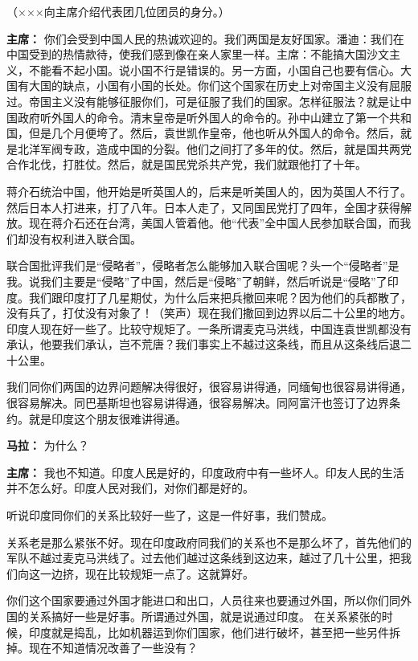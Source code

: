 \begin{list}{}
（×××向主席介绍代表团几位团员的身分。）

\item[\textbf{主席：}] 你们会受到中国人民的热诚欢迎的。我们两国是友好国家。潘迪：我们在中国受到的热情款待，使我们感到像在亲人家里一样。主席：不能搞大国沙文主义，不能看不起小国。说小国不行是错误的。另一方面，小国自己也要有信心。大国有大国的缺点，小国有小国的长处。你们这个国家在历史上对帝国主义没有屈服过。帝国主义没有能够征服你们，可是征服了我们的国家。怎样征服法？就是让中国政府听外国人的命令。清末皇帝是听外国人的命令的。孙中山建立了第一个共和国，但是几个月便垮了。然后，袁世凯作皇帝，他也听从外国人的命令。然后，就是北洋军阀专政，造成中国的分裂。他们之间打了多年的仗。然后，就是国共两党合作北伐，打胜仗。然后，就是国民党杀共产党，我们就跟他打了十年。

蒋介石统治中国，他开始是听英国人的，后来是听美国人的，因为英国人不行了。然后日本人打进来，打了八年。日本人走了，又同国民党打了四年，全国才获得解放。现在蒋介石还在台湾，美国人管着他。他“代表”全中国人民参加联合国，而我们却没有权利进入联合国。

联合国批评我们是“侵略者”，侵略者怎么能够加入联合国呢？头一个“侵略者”是我。说我们主要是“侵略”了中国，然后是“侵略”了朝鲜，然后听说是“侵略”了印度。我们跟印度打了几星期仗，为什么后来把兵撤回来呢？因为他们的兵都散了，没有兵了，打仗没有对象了！（笑声）现在我们撒回到边界以后二十公里的地方。印度人现在好一些了。比较守规矩了。一条所谓麦克马洪线，中国连袁世凯都没有承认，他要我们承认，岂不荒唐？我们事实上不越过这条线，而且从这条线后退二十公里。

我们同你们两国的边界问题解决得很好，很容易讲得通，同缅甸也很容易讲得通，很容易解决。同巴基斯坦也容易讲得通，很容易解决。同阿富汗也签订了边界条约。就是印度这个朋友很难讲得通。

\item[\textbf{马拉：}] 为什么？

\item[\textbf{主席：}] 我也不知道。印度人民是好的，印度政府中有一些坏人。印友人民的生活并不怎么好。印度人民对我们，对你们都是好的。

听说印度同你们的关系比较好一些了，这是一件好事，我们赞成。

关系老是那么紧张不好。现在印度政府同我们的关系也不是那么坏了，首先他们的军队不越过麦克马洪线了。过去他们越过这条线到这边来，越过了几十公里，把我们向这一边挤，现在比较规矩一点了。这就算好。

你们这个国家要通过外国才能进口和出口，人员往来也要通过外国，所以你们同外国的关系搞好一些是好事。所谓通过外国，就是说通过印度。 在关系紧张的时候，印度就是捣乱，比如机器运到你们国家，他们进行破坏，甚至把一些另件拆掉。现在不知道情况改善了一些没有？


\end{list}
